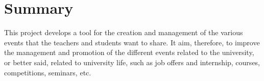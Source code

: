 

\chapter*{Summary}

This project develops a tool for the creation and management of the various events that the teachers and students want to share. It aim, therefore, to improve the management and promotion of the different events related to the university, or better said, related to university life, such as job offers and internship, courses, competitions, seminars, etc.



